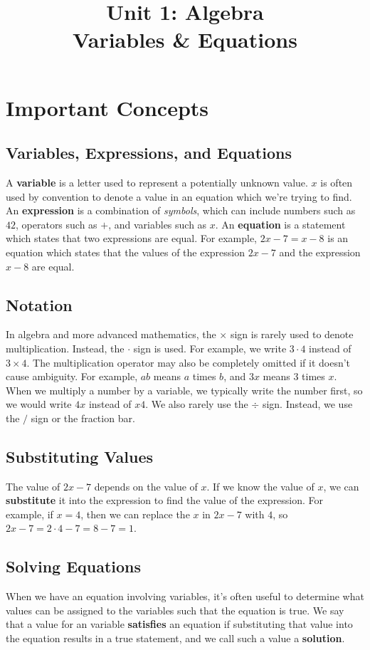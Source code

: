 \documentclass{article}
\title{Unit 1: Algebra \\ Variables \& Equations}
\author{}
\date{}
\begin{document}
    \maketitle
    \section*{Important Concepts}
    \subsection*{Variables, Expressions, and Equations}
    A \textbf{variable} is a letter used to represent a potentially unknown
    value. $x$ is often used by convention to denote a value in an equation
    which we're trying to find. An \textbf{expression} is a combination of
    \emph{symbols}, which can include numbers such as $42$, operators such as
    $+$, and variables such as $x$. An \textbf{equation} is a statement which
    states that two expressions are equal. For example, $2x - 7 = x - 8$ is an
    equation which states that the values of the expression $2x - 7$ and the
    expression $x - 8$ are equal.
    \subsection*{Notation}
    In algebra and more advanced mathematics, the $\times$ sign is rarely used
    to denote multiplication. Instead, the $\cdot$ sign is used. For example, we
    write $3 \cdot 4$ instead of $3 \times 4$. The multiplication operator may
    also be completely omitted if it doesn't cause ambiguity. For example, $ab$
    means $a$ times $b$, and $3x$ means $3$ times $x$. When we multiply a number
    by a variable, we typically write the number first, so we would write $4x$
    instead of $x4$. We also rarely use the $\div$ sign. Instead, we use the $/$
    sign or the fraction bar.
    \subsection*{Substituting Values}
    The value of $2x - 7$ depends on the value of $x$. If we know the value of
    $x$, we can \textbf{substitute} it into the expression to find the value of
    the expression. For example, if $x = 4$, then we can replace the $x$ in $2x
    - 7$ with $4$, so $2x - 7 = 2 \cdot 4 - 7 = 8 - 7 = 1$.
    \subsection*{Solving Equations}
    When we have an equation involving variables, it's often useful to determine
    what values can be assigned to the variables such that the equation is true.
    We say that a value for an variable \textbf{satisfies} an equation if
    substituting that value into the equation results in a true statement, and
    we call such a value a \textbf{solution}.
\end{document}
